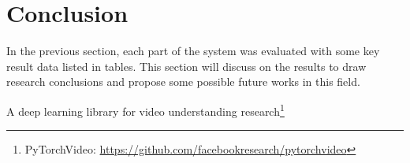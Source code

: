 \chapter{Conclusion}
\label{chap:Conclusion}
In the previous section, each part of the system was evaluated with some key result data listed in tables.
This section will discuss on the results to draw research conclusions and propose some possible future works in this field.


A deep learning library for video understanding research\footnote{PyTorchVideo: \url{https://github.com/facebookresearch/pytorchvideo}}
